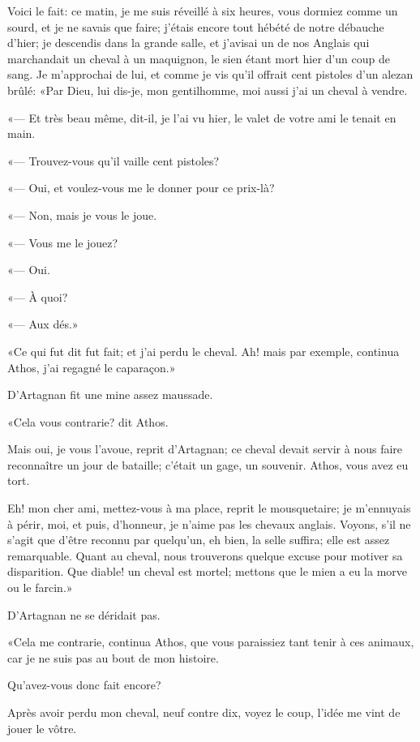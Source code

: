 \speak  Voici le fait: ce matin, je me suis réveillé à six heures, vous dormiez comme un sourd, et je ne savais que faire; j'étais encore tout hébété de notre débauche d'hier; je descendis dans la grande salle, et j'avisai un de nos Anglais qui marchandait un cheval à un maquignon, le sien étant mort hier d'un coup de sang. Je m'approchai de lui, et comme je vis qu'il offrait cent pistoles d'un alezan brûlé: «Par Dieu, lui dis-je, mon gentilhomme, moi aussi j'ai un cheval à vendre. 

«--- Et très beau même, dit-il, je l'ai vu hier, le valet de votre ami le tenait en main. 

«--- Trouvez-vous qu'il vaille cent pistoles? 

«--- Oui, et voulez-vous me le donner pour ce prix-là? 

«--- Non, mais je vous le joue. 

«--- Vous me le jouez? 

«--- Oui. 

«--- À quoi? 

«--- Aux dés.» 

«Ce qui fut dit fut fait; et j'ai perdu le cheval. Ah! mais par exemple, continua Athos, j'ai regagné le caparaçon.» 

D'Artagnan fit une mine assez maussade. 

«Cela vous contrarie? dit Athos. 

\speak  Mais oui, je vous l'avoue, reprit d'Artagnan; ce cheval devait servir à nous faire reconnaître un jour de bataille; c'était un gage, un souvenir. Athos, vous avez eu tort. 

\speak  Eh! mon cher ami, mettez-vous à ma place, reprit le mousquetaire; je m'ennuyais à périr, moi, et puis, d'honneur, je n'aime pas les chevaux anglais. Voyons, s'il ne s'agit que d'être reconnu par quelqu'un, eh bien, la selle suffira; elle est assez remarquable. Quant au cheval, nous trouverons quelque excuse pour motiver sa disparition. Que diable! un cheval est mortel; mettons que le mien a eu la morve ou le farcin.» 

D'Artagnan ne se déridait pas. 

«Cela me contrarie, continua Athos, que vous paraissiez tant tenir à ces animaux, car je ne suis pas au bout de mon histoire. 

\speak  Qu'avez-vous donc fait encore? 

\speak  Après avoir perdu mon cheval, neuf contre dix, voyez le coup, l'idée me vint de jouer le vôtre. 

